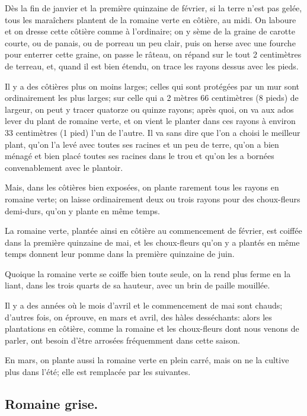 \documentclass[10pt,a4paper]{book}
\begin{document}
Dès la fin de janvier et la première quinzaine de février, si la terre n'est pas gelée, tous les maraîchers plantent de la romaine verte en côtière, au midi. On laboure et on dresse cette côtière comme à l'ordinaire; on y sème de la graine de carotte courte, ou de panais, ou de porreau un peu clair, puis on herse avec une fourche pour enterrer cette graine, on passe le râteau, on répand sur le tout 2 centimètres de terreau, et, quand il est bien étendu, on trace les rayons dessus avec les pieds.

Il y a des côtières plus on moins larges; celles qui sont protégées par un mur sont ordinairement les plus larges; sur celle qui a 2 mètres 66 centimètres (8 pieds) de largeur, on peut y tracer quatorze ou quinze rayons; après quoi, on va aux ados lever du plant de romaine verte, et on vient le planter dans ces rayons à environ 33 centimètres (1 pied) l'un de l'autre. Il va sans dire que l'on a choisi le meilleur plant, qu'on l'a levé avec toutes ses racines et un peu de terre, qu'on a bien ménagé et bien placé toutes ses racines dans le trou et qu'on les a bornées convenablement avec le plantoir.

Mais, dans les côtières bien exposées, on plante rarement tous les rayons en romaine verte; on laisse ordinairement deux ou trois rayons pour des choux-fleurs demi-durs, qu'on y plante en même temps.

La romaine verte, plantée ainsi en côtière au commencement de février, est coiffée dans la première quinzaine de mai, et les choux-fleurs qu'on y a plantés en même temps donnent leur pomme dans la première quinzaine de juin.

Quoique la romaine verte se coiffe bien toute seule, on la rend plus ferme en la liant, dans les trois quarts de sa hauteur, avec un brin de paille mouillée.

Il y a des années où le mois d'avril et le commencement de mai sont chauds; d'autres fois, on éprouve, en mars et avril, des hàles desséchants: alors les plantations en côtière, comme la romaine et les choux-fleurs dont nous venons de parler, ont besoin d'être arrosées fréquemment dans cette saison.

En mars, on plante aussi la romaine verte en plein carré, mais on ne la cultive plus dans l'été; elle est remplacée par les suivantes.

\subsection{Romaine grise.}
\end{document}

